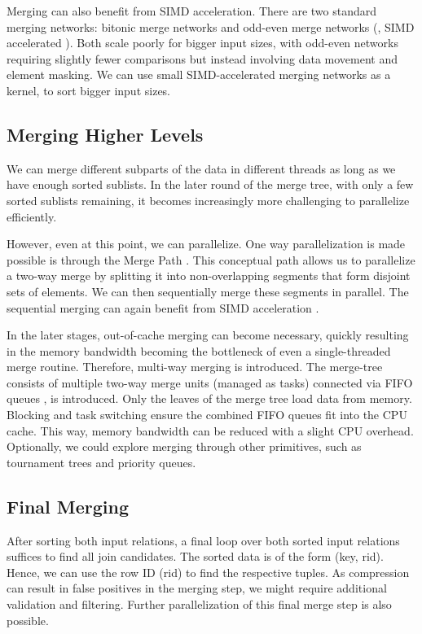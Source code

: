 Merging can
also benefit from SIMD acceleration. There are two standard merging networks: bitonic merge networks
and odd-even merge networks (\cite{10.1145/1468075.1468121}, SIMD accelerated \cite{4336211}).
Both scale poorly for bigger input sizes, with odd-even networks 
requiring slightly fewer comparisons but instead involving data movement and element masking.
We can use small SIMD-accelerated merging networks as a kernel, to sort bigger input sizes.

\subsection{Merging Higher Levels}

We can merge different subparts of the data in
different threads as long as we have enough sorted sublists. In the later round of the merge tree,
with only a few sorted sublists remaining, it becomes increasingly more challenging to parallelize
efficiently. 

However, even at this point, we can parallelize. One way parallelization is made possible 
is through the Merge Path \cite{MergePath}. This conceptual path allows us to parallelize a two-way merge by splitting
it into non-overlapping segments that form disjoint sets of elements. We can then sequentially
merge these segments in parallel. The sequential merging can again benefit from SIMD acceleration \cite{Watkins}.

In the later stages, out-of-cache merging can become necessary, quickly resulting in the memory
bandwidth becoming the bottleneck of even a single-threaded merge routine.  Therefore, multi-way
merging \cite{Balkesen} is introduced. The merge-tree consists of multiple two-way merge units (managed as tasks) connected via FIFO queues
, is introduced. Only the leaves of the merge tree load data from memory. Blocking and task switching 
ensure the combined FIFO queues fit into the CPU cache. This way, memory bandwidth can be reduced
with a slight CPU overhead. Optionally, we could explore merging through other primitives, such as
tournament trees and priority queues. 

\subsection{Final Merging}

After sorting both input relations, a final loop over both sorted input relations suffices to find all
join candidates. The sorted data is of the form (key, rid). Hence, we can use the row ID (rid) to
find the respective tuples. As compression can result in false positives in the merging step, we
might require additional validation and 
filtering. Further parallelization of this final merge step is also possible.

